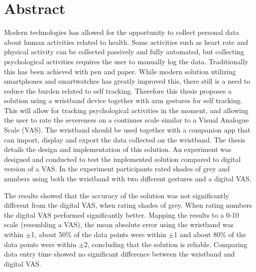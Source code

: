 \chapter{Abstract}
Modern technologies has allowed for the opportunity to collect personal data about human activities related to health. Some activities such as heart rate and physical activity can be collected passively and fully automated, but collecting psychological activities requires the user to manually log the data. Traditionally this has been achieved with pen and paper. While modern solution utilizing smartphones and smartwatches has greatly improved this, there still is a need to reduce the burden related to self tracking. Therefore this thesis proposes a solution using a wristband device together with arm gestures for self tracking. This will allow for tracking psychological activities in the moment, and allowing the user to rate the severeness on a continues scale similar to a Visual Analogue Scale (VAS). The wristband should be used together with a companion app that can import, display and export the data collected on the wristband. The thesis details the design and implementation of this solution. An experiment was designed and conducted to test the implemented solution compared to digital version of a VAS. In the experiment participants rated shades of grey and numbers using both the wristband with two different gestures and a digital VAS.

The results showed that the accuracy of the solution was not significantly different from the digital VAS, when rating shades of grey. When rating numbers the digital VAS performed significantly better. Mapping the results to a 0-10 scale (resembling a VAS), the mean absolute error using the wristband was within $\pm$1, about 50\% of the data points were within $\pm$1 and about 80\% of the data points were within $\pm$2, concluding that the solution is reliable. Comparing data entry time showed no significant difference between the wristband and digital VAS.